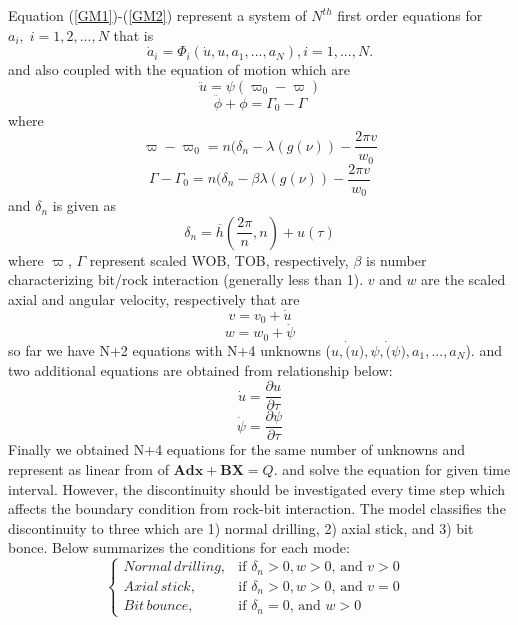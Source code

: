 Equation (\ref{GM1})-(\ref{GM2}) represent a system of $N^{th}$ first order equations for $a_i,\; i=1,2,...,N$ that is 
\begin{equation}\label{Norder}
  \dot{a}_i = \Phi_i(\dot{u}, u, a_1, ..., a_N), i=1,...,N.
\end{equation}
and also coupled with the equation of motion which are
\begin{equation}\label{GE1_}
  \ddot{u} = \psi(\varpi_0 - \varpi)
\end{equation}
\begin{equation}\label{GE2_}
  \ddot{\phi} + \phi = \Gamma_0 - \Gamma
\end{equation}
where 
\begin{equation}\label{GE1}
  \varpi-\varpi_0 = n(\delta_n - \lambda(g(\nu)) - \frac{2\pi v}{w_0}
\end{equation}
\begin{equation}\label{GE2}
  \Gamma-\Gamma_0 = n(\delta_n -\beta \lambda(g(\nu)) - \frac{2\pi v}{w_0}
\end{equation}
and $\delta_n$ is given as
\begin{equation}\label{deltan1}
  \delta_n = \overline{h}\left(\frac{2\pi}{n}, n\right) + u(\tau)
\end{equation}
where $\varpi$, $\Gamma$ represent scaled WOB, TOB, respectively,  $\beta$ is number characterizing bit/rock interaction (generally less than 1). $v$ and $w$ are the scaled axial and angular velocity, respectively that are
\begin{equation}\label{scaled_axial_ve}
  v = v_0 + \dot{u}
\end{equation}
\begin{equation}\label{scaled_angular_vel}
  w = w_0 + \dot{\psi}
\end{equation}
so far we have N+2 equations with N+4 unknowns ($u, \dot(u), \psi, \dot(\psi), a_1, ..., a_N$). and two additional equations are obtained from relationship below:
\begin{equation}\label{axial_dis_vel}
  \dot{u} = \frac{\partial u}{\partial \tau}
\end{equation}
\begin{equation}\label{angular_dis_vel}
  \dot{\psi} = \frac{\partial \psi}{\partial \tau}
\end{equation}
Finally we obtained N+4 equations for the same number of unknowns and represent as linear from of $\bm{Adx} + \bm{BX} = Q$. and solve the equation for given time interval. However, the discontinuity should be investigated every time step which affects the boundary condition from rock-bit interaction. The model classifies the discontinuity to three which are 1) normal drilling, 2) axial stick, and 3) bit bonce. Below summarizes the conditions for each mode:
\begin{equation}\label{drillingmodes}
  \begin{cases}
    Normal\,drilling, & \mbox{if $\delta_n > 0, w > 0$, and $v > 0$ }  \\
    Axial\, stick, & \mbox{if $\delta_n >0, w > 0$, and $v = 0$ } \\
    Bit\,bounce, & \mbox{if $\delta_n = 0$, and $w > 0$}
  \end{cases}
\end{equation}

